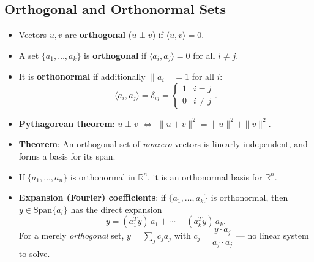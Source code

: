 \documentclass[hidelinks]{article}
\begin{document}
\subsection{Orthogonal and Orthonormal Sets}
\begin{itemize}
    \item Vectors $u, v$ are \textbf{orthogonal} ($u\perp v$) if $\langle u,v\rangle = 0$.
    \item A set $\{a_1,\ldots,a_k\}$ is \textbf{orthogonal} if $\langle a_i, a_j\rangle = 0$ for all $i\neq j$.
    \item It is \textbf{orthonormal} if additionally $\|a_i\| = 1$ for all $i$:
    \[
        \langle a_i, a_j\rangle = \delta_{ij} = \begin{cases}1 & i=j\\ 0 & i\neq j\end{cases}.
    \]
    \item \textbf{Pythagorean theorem}: $u\perp v$ $\iff$ $\|u+v\|^2 = \|u\|^2 + \|v\|^2$.
    \item \textbf{Theorem}: An orthogonal set of \emph{nonzero} vectors is linearly independent, and forms a basis for its span.
    \item If $\{a_1,\ldots,a_n\}$ is orthonormal in $\mathbb{R}^n$, it is an orthonormal basis for $\mathbb{R}^n$.
    \item \textbf{Expansion (Fourier) coefficients}: if $\{a_1,\ldots,a_k\}$ is orthonormal, then $y\in\mathrm{Span}\{a_i\}$ has the direct expansion
    \[
        y = (a_1^Ty)\,a_1 + \cdots + (a_k^Ty)\,a_k.
    \]
    For a merely \emph{orthogonal} set, $y = \sum_j c_j a_j$ with $c_j = \dfrac{y\cdot a_j}{a_j\cdot a_j}$ — no linear system to solve.
\end{itemize}
\end{document}
